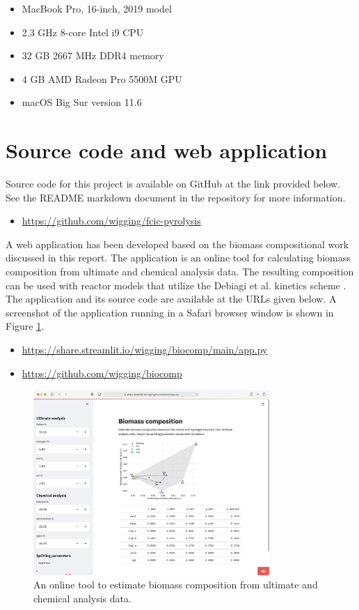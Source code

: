 \begin{itemize}
    \item MacBook Pro, 16-inch, 2019 model
    \item 2.3 GHz 8-core Intel i9 CPU
    \item 32 GB 2667 MHz DDR4 memory
    \item 4 GB AMD Radeon Pro 5500M GPU
    \item macOS Big Sur version 11.6
\end{itemize}

\section{Source code and web application}

Source code for this project is available on GitHub at the link provided below. See the README markdown document in the repository for more information.

\begin{itemize}
    \item \url{https://github.com/wigging/fcic-pyrolysis}
\end{itemize}

A web application has been developed based on the biomass compositional work discussed in this report. The application is an online tool for calculating biomass composition from ultimate and chemical analysis data. The resulting composition can be used with reactor models that utilize the Debiagi et al. kinetics scheme \cite{Debiagi-2018}. The application and its source code are available at the URLs given below. A screenshot of the application running in a Safari browser window is shown in Figure \ref{fig:webtool}.

\begin{itemize}
    \item \url{https://share.streamlit.io/wigging/biocomp/main/app.py}
    \item \url{https://github.com/wigging/biocomp}
\end{itemize}

\begin{figure}[H]
    \centering
    \includegraphics[width=0.8\textwidth]{figures/webtool.png}
    \caption{An online tool to estimate biomass composition from ultimate and chemical analysis data.}
    \label{fig:webtool}
\end{figure}
